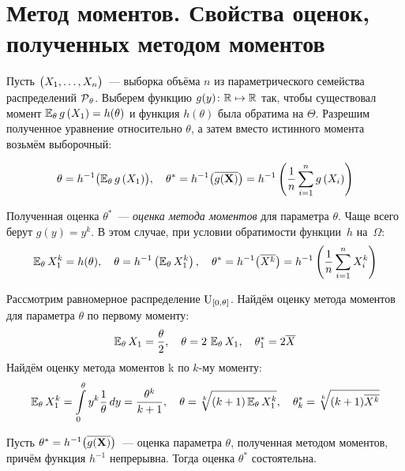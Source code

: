 \section{Метод моментов. Свойства оценок, полученных методом моментов}

Пусть $\bigl(X_1, \ldots, X_n \bigr)$~--- выборка объёма $n$ из параметрического семейства распределений $\operatorname{\mathcal{P}}_\theta$. 
Выберем функцию $g(y)\colon \mathbb{R} \mapsto \mathbb{R}$ так, чтобы существовал момент $\operatorname{\operatorname{\mathbb{E}}_{\theta}} g\left(X_{1}\right)=h(\theta)$ и функция $h(\theta)$ была обратима на $\Theta$. 
Разрешим полученное уравнение относительно $\theta$, а затем вместо истинного момента возьмём выборочный:

\begin{equation*}
    \theta = h^{-1}\bigl(\operatorname{\operatorname{\mathbb{E}}_{\theta}} g\left(X_{1}\right)\bigr), \quad 
    \theta^{*}=h^{-1}\bigl(\overline{g(\mathbf{X})}\bigr) = 
    h^{-1}\left(\frac{1}{n} \sum\limits_{i=1}^{n} g\left(X_{i}\right)\right)
\end{equation*}

Полученная оценка $\theta^{*}$~--- \textit{оценка метода моментов} для параметра $\theta$. 
Чаще всего берут $g(y)=y^{k}$. 
В этом случае, при условии обратимости функции~$h$ на~$\Omega$:
\begin{equation*}
    \operatorname{\operatorname{\mathbb{E}}_{\theta}} X_{1}^{k}=h(\theta), \quad 
    \theta = h^{-1}\left(\operatorname{\operatorname{\mathbb{E}}_{\theta}} X_{1}^{k}\right), \quad 
    \theta^{*} = h^{-1}\bigl( \overline{X^{k}} \bigr) = 
    h^{-1}\left(\frac{1}{n} \sum\limits_{i=1}^{n} X_{i}^{k}\right)
\end{equation*}

\begin{exmp}
    Рассмотрим равномерное распределение $\operatorname{\mathrm{U}}_{[0, \theta]}$. 
    Найдём оценку метода моментов для параметра $\theta$ по первому моменту:
    \begin{equation*}
        \operatorname{\operatorname{\mathbb{E}}_{\theta}} X_{1}=\frac{\theta}{2}, \quad 
        \theta = 2\,\operatorname{\operatorname{\mathbb{E}}_{\theta}} X_{1}, \quad 
        \theta_{1}^{*}=2 \overline{X}
    \end{equation*}
    Найдём оценку метода моментов k по $k$-му моменту:
    \begin{equation*}
        \operatorname{\operatorname{\mathbb{E}}_{\theta}} X_{1}^{k} =
        \int\limits_{0}^{\theta} y^{k} \frac{1}{\theta} \, dy = 
        \frac{\theta^{k}}{k+1}, \quad 
        \theta=\sqrt[k]{(k+1) \operatorname{\operatorname{\mathbb{E}}_{\theta}} X_{1}^{k}}, \quad 
        \theta_{k}^{*}=\sqrt[k]{(k+1) \overline{X^{k}}}
    \end{equation*}
\end{exmp}

\begin{thm*}
    Пусть $\theta^{*}=h^{-1}\bigl(\overline{g(\mathbf{X})}\bigr)$~--- оценка параметра $\theta$, полученная методом моментов, причём функция $h^{-1}$ непрерывна. 
    Тогда оценка $\theta^{*}$ состоятельна.
\end{thm*}

